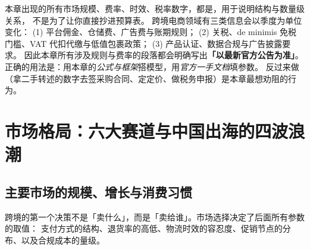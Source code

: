 \begin{pitfall}
本章出现的所有市场规模、费率、时效、税率数字，都是，用于说明结构与数量级关系，
不是为了让你直接抄进预算表。
跨境电商领域有三类信息会以季度为单位变化：
(1) 平台佣金、仓储费、广告费与账期规则；
(2) 关税、de minimis 免税门槛、VAT 代扣代缴与低值包裹政策；
(3) 产品认证、数据合规与广告披露要求。
因此本章所有涉及规则与费率的段落都会明确写出\textbf{「以最新官方公告为准」}。
正确的用法是：用本章的\emph{公式与框架}搭模型，用\emph{官方一手文档}填参数。
反过来做（拿二手转述的数字去签采购合同、定定价、做税务申报）是本章最想劝阻的行为。
\end{pitfall}

\section{市场格局：六大赛道与中国出海的四波浪潮}
\label{sec:cbec-market}

\subsection{主要市场的规模、增长与消费习惯}

跨境的第一个决策不是「卖什么」，而是「卖给谁」。市场选择决定了后面所有参数的取值：
支付方式的结构、退货率的高低、物流时效的容忍度、促销节点的分布、以及合规成本的量级。

